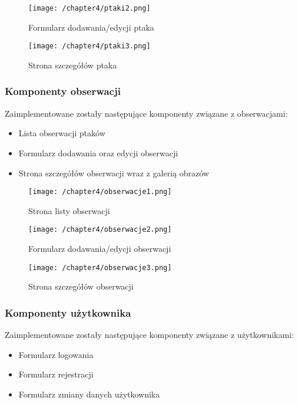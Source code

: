 \begin{figure}[!htb]
	\centering
	\texttt{[image: /chapter4/ptaki2.png]}
	\caption{Formularz dodawania/edycji ptaka}
	\label{fig:ptaki2}
\end{figure}

\begin{figure}[!htb]
	\centering
	\texttt{[image: /chapter4/ptaki3.png]}
	\caption{Strona szczegółów ptaka}
	\label{fig:ptaki3}
\end{figure}

\subsubsection{Komponenty obserwacji}
Zaimplementowane zostały następujące komponenty związane z obserwacjami:
\begin{itemize}
	\item Lista obserwacji ptaków
	\item Formularz dodawania oraz edycji obserwacji
	\item Strona szczegółów obserwacji wraz z galerią obrazów
\end{itemize}

\begin{figure}[!hb]
	\centering
	\texttt{[image: /chapter4/obserwacje1.png]}
	\caption{Strona listy obserwacji}
	\label{fig:obserwacje1}
\end{figure}

\begin{figure}[!hb]
	\centering
	\texttt{[image: /chapter4/obserwacje2.png]}
	\caption{Formularz dodawania/edycji obserwacji}
	\label{fig:obserwacje2}
\end{figure}

\begin{figure}[!htb]
	\centering
	\texttt{[image: /chapter4/obserwacje3.png]}
	\caption{Strona szczegółów obserwacji}
	\label{fig:obserwacje3}
\end{figure}

\subsubsection{Komponenty użytkownika}
Zaimplementowane zostały następujące komponenty związane z użytkownikami:
\begin{itemize}
	\item Formularz logowania
	\item Formularz rejestracji
	\item Formularz zmiany danych użytkownika
\end{itemize}

